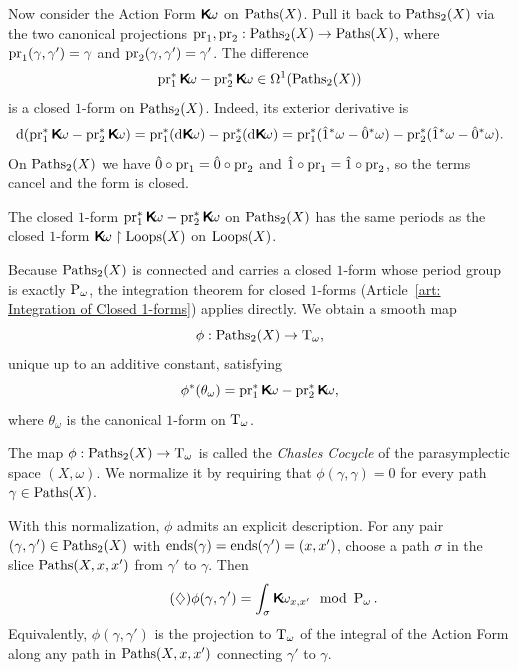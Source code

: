 \documentclass[10pt,reqno,letterpaper,twoside]{amsbook}
\begin{document}
\begin{article}
    Now consider the Action Form $\boldsymbol{\mathsf{K}}\!\omega$ on $\operatorname{Paths}(X)$.
    Pull it back to $\operatorname{Paths}_2(X)$ via the two canonical projections
    $\pr_1, \pr_2: \Paths_2(X) \to \Paths(X)$,
    where $\pr_1(\gamma,\gamma') = \gamma$ and $\pr_2(\gamma,\gamma') = \gamma'$.
    The difference
    \[
      \pr_1^*\Komega - \pr_2^*\Komega \in \DForms^1(\Paths_2(X))
      \]%
    is a closed $1$-form on $\operatorname{Paths}_2(X)$.
    Indeed,
    its exterior derivative is
    \[
      \der(\pr_1^*\Komega - \pr_2^*\Komega)
      = \pr_1^*(\der\Komega) - \pr_2^*(\der\Komega)
      = \pr_1^*(\1^*\omega - \0^*\omega) - \pr_2^*(\1^*\omega - \0^*\omega).
      \]%
    On $\operatorname{Paths}_2(X)$ we have $\0 \circ \pr_1 = \0 \circ \pr_2$ and
    $\1 \circ \pr_1 = \1 \circ \pr_2$,
    so the terms cancel and the form is closed.
    
    \begin{proposition}[2]
      The closed $1$-form $\pr_1^*\Komega - \pr_2^*\Komega$ on $\operatorname{Paths}_2(X)$
      has the same periods as the closed $1$-form
      $\boldsymbol{\mathsf{K}}\!\omega \restriction \operatorname{Loops}(X)$ on $\operatorname{Loops}(X)$.
    \end{proposition}
    
    Because $\operatorname{Paths}_2(X)$ is connected and carries a closed $1$-form
    whose period group is exactly $\operatorname{P}_\omega$,
    the integration theorem for closed $1$-forms
    (Article~\ref{art: Integration of Closed 1-forms})
    applies directly.
    We obtain a smooth map
    \[
      \phi: \operatorname{Paths}_2(X) \to \mathrm{T}_\omega,
      \]%
    unique up to an additive constant,
    satisfying
    \[
      \phi^*(\theta_\omega) = \pr_1^*\Komega - \pr_2^*\Komega,
      \]%
    where $\theta_\omega$ is the canonical $1$-form on $\mathrm{T}_\omega$.
    
    \begin{definition}
      The map $\phi: \operatorname{Paths}_2(X) \to \mathrm{T}_\omega$ is called the
      \emph{Chasles Cocycle} of the parasymplectic space $(X,\omega)$.
      We normalize it by requiring that
      $\phi(\gamma,\gamma) = 0$ for every path $\gamma \in \operatorname{Paths}(X)$.
    \end{definition}
    
    With this normalization,
    $\phi$ admits an explicit description.
    For any pair $(\gamma,\gamma') \in \operatorname{Paths}_2(X)$ with
    $\operatorname{ends}(\gamma) = \operatorname{ends}(\gamma') = (x,x')$,
    choose a path $\sigma$ in the slice $\operatorname{Paths}(X,x,x')$
    from $\gamma'$ to $\gamma$.
    Then
    \begin{equation}\tag{$\diamondsuit$}
      \phi(\gamma,\gamma') = \int_\sigma \boldsymbol{\mathsf{K}}\!\omega_{x,x'} \mod {\operatorname{P}_\omega}.
    \end{equation}
    Equivalently,
    $\phi(\gamma,\gamma')$ is the projection to $\mathrm{T}_\omega$ of the integral
    of the Action Form along any path in $\operatorname{Paths}(X,x,x')$
    connecting $\gamma'$ to $\gamma$.
    

\end{article}
\end{document}
